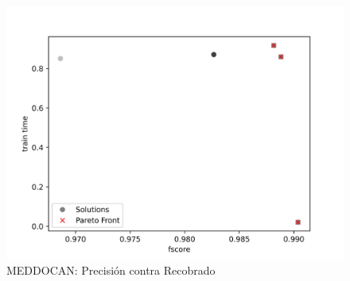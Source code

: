 \begin{figure}[ht]
    \centering
    \includegraphics[scale=0.65]{Pictures/meddocan_precision_vs_recall.jpg}
    \caption{MEDDOCAN: Precisi\'on contra Recobrado}
    \label{impl:fig:MEDDOCAN:precision_vs_recall}
\end{figure}
